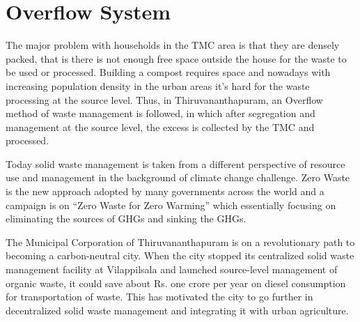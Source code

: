 \documentclass[12pt,a4paper]{  report}
\begin{document}
\section{Overflow System}
\begin{justify}
	The major problem with households in the TMC area is that they are densely packed, that is there is not enough free space outside the house for the waste to be used or processed. Building a compost requires space and nowadays with increasing population density in the urban areas it's hard for the waste processing at the source level. Thus, in Thiruvananthapuram, an Overflow method of waste management is followed, in which after segregation and management at the source level, the excess is collected by the TMC and processed.
	
	Today solid waste management is taken from a different perspective of resource use and management in the background of climate change challenge. Zero Waste is the new approach adopted by many governments across the world and a campaign is on “Zero Waste for Zero Warming” which essentially focusing on eliminating the sources of GHGs and sinking the GHGs.
	
	The Municipal Corporation of Thiruvananthapuram is on a revolutionary path to becoming a carbon-neutral city. When the city stopped its centralized solid waste management facility at Vilappilsala and launched source-level management of organic waste, it could save about Rs. one crore per year on diesel consumption for transportation of waste. This has motivated the city to go further in decentralized solid waste management and integrating it with urban agriculture.
	
\end{justify}

	
\end{document}
